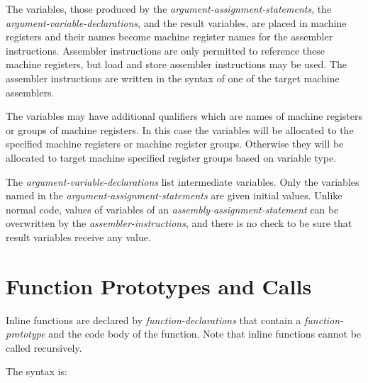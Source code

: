 \documentclass[12pt]{article}
\begin{document}
The variables, those produced by the {\em argument-assignment-statements},
the {\em argument-variable-declarations},
and the result variables, are placed in machine registers
and their names become machine register names for the assembler instructions.
Assembler instructions are only permitted to reference these
machine registers, but load and store assembler instructions may be used.
The assembler instructions are written in the syntax of one of the
target machine assemblers.

The variables may have additional qualifiers which
are names of machine registers or groups of machine registers.  In this case
the variables will be allocated to the specified machine registers or
machine register groups.  Otherwise they will be allocated to target
machine specified register groups based on variable type.

The {\em argument-variable-declarations} list intermediate
variables.  Only the variables named in the {\em argument-assignment-statements}
are given initial values.  Unlike normal code, values of variables
of an {\em assembly-assignment-statement} can be overwritten by the
{\em assembler-instructions}, and there is no check to be sure that
result variables receive any value.

\section{Function Prototypes and Calls}
\label{FUNCTION-PROTOTYPES-AND-CALLS}

Inline functions are declared by {\em function-declarations}
that contain a {\em function-prototype} and the code body of the
function.  Note that inline functions cannot be called recursively.

The syntax is:
\end{document}
